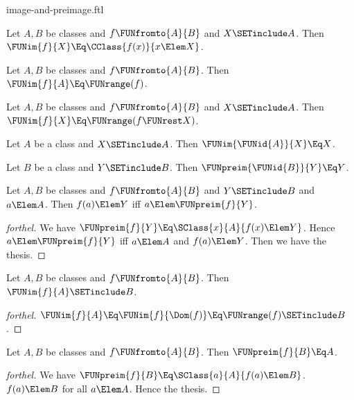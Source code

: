 \documentclass{stex}
\begin{document}
\begin{smodule}{image-and-preimage.ftl}

\begin{proposition}[forthel]
  Let $A, B$ be classes and $f \FUNfromto{A}{B}$ and $X \SETinclude A$.
  Then $\FUNim{f}{X} \Eq \CClass{f(x)}{x \Elem X}$.
\end{proposition}

\begin{corollary}[forthel]
  Let $A, B$ be classes and $f \FUNfromto{A}{B}$.
  Then $\FUNim{f}{A} \Eq \FUNrange(f)$.
\end{corollary}

\begin{corollary}[forthel]
  Let $A, B$ be classes and $f \FUNfromto{A}{B}$ and $X \SETinclude A$.
  Then $\FUNim{f}{X} \Eq \FUNrange(f \FUNrest X)$.
\end{corollary}

\begin{proposition}[forthel]
  Let $A$ be a class and $X \SETinclude A$.
  Then $\FUNim{\FUNid{A}}{X} \Eq X$.
\end{proposition}

\begin{proposition}[forthel]
  Let $B$ be a class and $Y \SETinclude B$.
  Then $\FUNpreim{\FUNid{B}}{Y} \Eq Y$.
\end{proposition}

\begin{proposition}[forthel]
  Let $A, B$ be classes and $f \FUNfromto{A}{B}$ and $Y \SETinclude B$ and $a \Elem A$.
  Then $f(a) \Elem Y$ iff $a \Elem \FUNpreim{f}{Y}$.
\end{proposition}
\begin{proof}[forthel]
  We have $\FUNpreim{f}{Y} \Eq \SClass{x}{A}{f(x) \Elem Y}$.
  Hence $a \Elem \FUNpreim{f}{Y}$ iff $a \Elem A$ and $f(a) \Elem Y$.
  Then we have the thesis.
\end{proof}

\begin{proposition}[forthel]
  Let $A, B$ be classes and $f \FUNfromto{A}{B}$.
  Then $\FUNim{f}{A} \SETinclude B$.
\end{proposition}
\begin{proof}[forthel]
  $\FUNim{f}{A}
    \Eq \FUNim{f}{\Dom(f)}
    \Eq \FUNrange(f)
    \SETinclude B$.
\end{proof}

\begin{proposition}[forthel]
  Let $A, B$ be classes and $f \FUNfromto{A}{B}$.
  Then $\FUNpreim{f}{B} \Eq A$.
\end{proposition}
\begin{proof}[forthel]
  We have $\FUNpreim{f}{B} \Eq \SClass{a}{A}{f(a) \Elem B}$.
  $f(a) \Elem B$ for all $a \Elem A$.
  Hence the thesis.
\end{proof}


\end{smodule}
\end{document}
